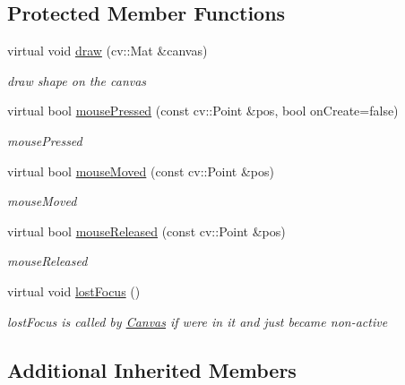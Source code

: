 \subsection*{Protected Member Functions}
\begin{DoxyCompactItemize}
\item 
virtual void \hyperlink{classcanvascv_1_1Polygon_a32e073cb9579fdf4645daf14e5143f22}{draw} (cv\+::\+Mat \&canvas)
\begin{DoxyCompactList}\small\item\em draw shape on the canvas \end{DoxyCompactList}\item 
virtual bool \hyperlink{classcanvascv_1_1Polygon_a87ce20dbc22fd0ce39d6e81de5e515ae}{mouse\+Pressed} (const cv\+::\+Point \&pos, bool on\+Create=false)
\begin{DoxyCompactList}\small\item\em mouse\+Pressed \end{DoxyCompactList}\item 
virtual bool \hyperlink{classcanvascv_1_1Polygon_aacc442ef4c0438ddb78c6ccce8e86618}{mouse\+Moved} (const cv\+::\+Point \&pos)
\begin{DoxyCompactList}\small\item\em mouse\+Moved \end{DoxyCompactList}\item 
virtual bool \hyperlink{classcanvascv_1_1Polygon_afea6bbe1beef916e6ec47ed257cb2374}{mouse\+Released} (const cv\+::\+Point \&pos)
\begin{DoxyCompactList}\small\item\em mouse\+Released \end{DoxyCompactList}\item 
virtual void \hyperlink{classcanvascv_1_1Polygon_a9cc78c0ace7940aa2cd78245b63938bc}{lost\+Focus} ()\hypertarget{classcanvascv_1_1Polygon_a9cc78c0ace7940aa2cd78245b63938bc}{}\label{classcanvascv_1_1Polygon_a9cc78c0ace7940aa2cd78245b63938bc}

\begin{DoxyCompactList}\small\item\em lost\+Focus is called by \hyperlink{classcanvascv_1_1Canvas}{Canvas} if we\textquotesingle{}re in it and just became non-\/active \end{DoxyCompactList}\end{DoxyCompactItemize}
\subsection*{Additional Inherited Members}


